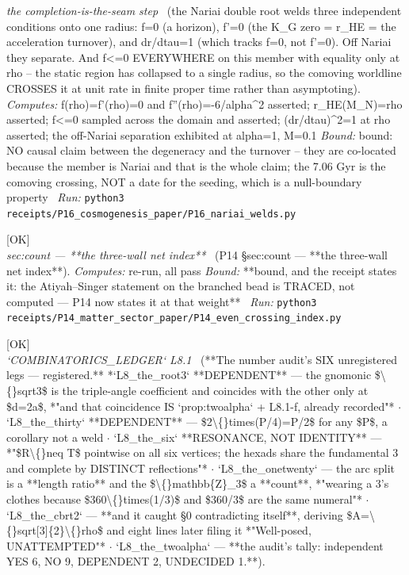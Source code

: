\begin{description}
\textit{the completion-is-the-seam step} \ (the Nariai double root welds three independent conditions onto one radius: f=0 (a horizon), f'=0 (the K\_G zero = r\_HE = the acceleration turnover), and dr/dtau=1 (which tracks f=0, not f'=0). Off Nariai they separate. And f<=0 EVERYWHERE on this member with equality only at rho -- the static region has collapsed to a single radius, so the comoving worldline CROSSES it at unit rate in finite proper time rather than asymptoting). 
\emph{Computes:} f(rho)=f'(rho)=0 and f''(rho)=-6/alpha\textasciicircum{}2 asserted; r\_HE(M\_N)=rho asserted; f<=0 sampled across the domain and asserted; (dr/dtau)\textasciicircum{}2=1 at rho asserted; the off-Nariai separation exhibited at alpha=1, M=0.1
 \emph{Bound:} bound: NO causal claim between the degeneracy and the turnover -- they are co-located because the member is Nariai and that is the whole claim; the 7.06 Gyr is the comoving crossing, NOT a date for the seeding, which is a null-boundary property
\ \emph{Run:} \texttt{python3 receipts/P16\_cosmogenesis\_paper/P16\_nariai\_welds.py}
\item[\label{rcpt:P14_even_crossing_index}\texttt{P14\_even\_crossing\_index}]\hfill\textsf{[OK]}\\
\textit{sec:count --- **the three-wall net index**} \ (P14 \S{}sec:count --- **the three-wall net index**). 
\emph{Computes:} re-run, all pass
 \emph{Bound:} **bound, and the receipt states it: the Atiyah--Singer statement on the branched bead is TRACED, not computed --- P14 now states it at that weight**
\ \emph{Run:} \texttt{python3 receipts/P14\_matter\_sector\_paper/P14\_even\_crossing\_index.py}
\item[\label{rcpt:L8_*}\texttt{L8\_*}]\hfill\textsf{[OK]}\\
\textit{`COMBINATORICS\_LEDGER` L8.1} \ (**The number audit's SIX unregistered legs --- registered.** *`L8\_the\_root3` **DEPENDENT** --- the gnomonic \$\textbackslash\{\}sqrt3\$ is the triple-angle coefficient and coincides with the other only at \$d=2a\$, *"and that coincidence IS `prop:twoalpha` + L8.1-f, already recorded"* \ensuremath{\cdot} `L8\_the\_thirty` **DEPENDENT** --- \$2\textbackslash\{\}times(P/4)=P/2\$ for any \$P\$, a corollary not a weld \ensuremath{\cdot} `L8\_the\_six` **RESONANCE, NOT IDENTITY** --- *"\$R\textbackslash\{\}neq T\$ pointwise on all six vertices; the hexads share the fundamental 3 and complete by DISTINCT reflections"* \ensuremath{\cdot} `L8\_the\_onetwenty` --- the arc split is a **length ratio** and the \$\textbackslash\{\}mathbb\{Z\}\_3\$ a **count**, *"wearing a 3's clothes because \$360\textbackslash\{\}times(1/3)\$ and \$360/3\$ are the same numeral"* \ensuremath{\cdot} `L8\_the\_cbrt2` --- **and it caught \S{}0 contradicting itself**, deriving \$A=\textbackslash\{\}sqrt[3]\{2\}\textbackslash\{\}rho\$ and eight lines later filing it *"Well-posed, UNATTEMPTED"* \ensuremath{\cdot} `L8\_the\_twoalpha` --- **the audit's tally: independent YES 6, NO 9, DEPENDENT 2, UNDECIDED 1.**). 

\end{description}

